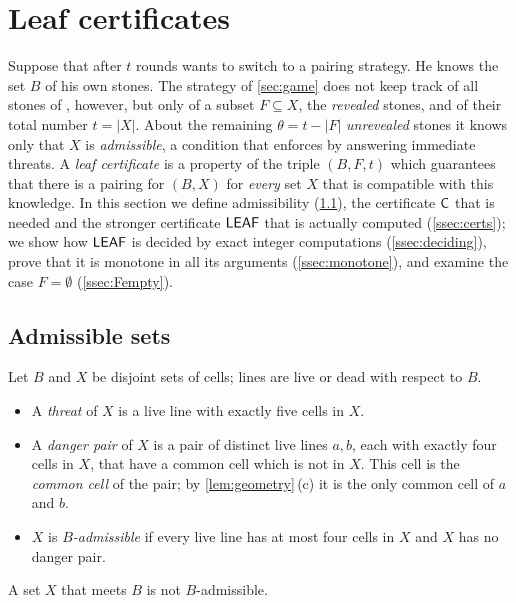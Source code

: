 \section{Leaf certificates}\label{sec:leaf}

Suppose that after $t$ rounds \Breaker{} wants to switch to a pairing strategy. He knows the set $B$ of his
own stones. The strategy of \cref{sec:game} does not keep track of all stones of \Maker, however, but
only of a subset $F\subseteq X$, the \emph{revealed} stones, and of their total number $t=|X|$. About the
remaining $\theta=t-|F|$ \emph{unrevealed} stones it knows only that $X$ is \emph{admissible}, a condition
that \Breaker{} enforces by answering immediate threats. A \emph{leaf certificate} is a property of the
triple $(B,F,t)$ which guarantees that there is a pairing for $(B,X)$ for \emph{every} set $X$ that is
compatible with this knowledge. In this section we define admissibility (\cref{ssec:adm}), the certificate
$\mathsf{C}$ that is needed and the stronger certificate $\mathsf{LEAF}$ that is actually computed (\cref{ssec:certs}); we
show how $\mathsf{LEAF}$ is decided by exact integer computations (\cref{ssec:deciding}), prove that it is monotone
in all its arguments (\cref{ssec:monotone}), and examine the case $F=\emptyset$ (\cref{ssec:Fempty}).

\subsection{Admissible sets}\label{ssec:adm}

\begin{definition}\label{def:admissible}
Let $B$ and $X$ be disjoint sets of cells; lines are live or dead with respect to $B$.
\begin{itemize}
\item A \emph{threat} of $X$ is a live line with exactly five cells in $X$.
\item A \emph{danger pair} of $X$ is a pair of distinct live lines $a,b$, each with exactly four cells in
      $X$, that have a common cell which is not in $X$. This cell is the \emph{common cell} of the pair; by
      \cref{lem:geometry}\,\textup{(c)} it is the only common cell of $a$ and $b$.
\item $X$ is \emph{$B$-admissible} if every live line has at most four cells in $X$ and $X$ has no danger
      pair.
\end{itemize}
A set $X$ that meets $B$ is not $B$-admissible.
\end{definition}

